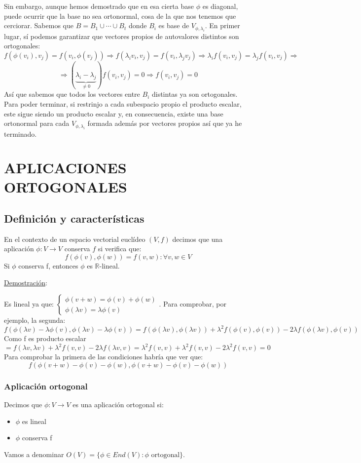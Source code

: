 \documentclass[10pt,a4paper,openright]{book}
\theoremstyle{break}
\begin{document}
Sin embargo, aunque hemos demostrado que en esa cierta base $\phi$ es diagonal, puede ocurrir que la base no sea ortonormal, cosa de la que nos tenemos que cerciorar. Sabemos que $B=B_1\cup \cdots \cup B_t$ donde $B_i$ es base de $V_{\phi, \lambda_i}$. En primer lugar, sí podemos garantizar que vectores propios de autovalores distintos son ortogonales:
$$f(\phi(v_i), v_j) = f(v_i, \phi(v_j))\Rightarrow f(\lambda_iv_i, v_j) = f(v_i, \lambda_j v_j) \Rightarrow \lambda_i f(v_i,v_j) = \lambda_j f(v_i,v_j)\Rightarrow$$
$$\Rightarrow (\underbrace{\lambda_i -\lambda_j}_{\neq 0})f(v_i,v_j) = 0\Rightarrow f(v_i, v_j) = 0$$
Así que sabemos que todos los vectores entre $B_i$ distintas ya son ortogonales. Para poder terminar, si restrinjo a cada subespacio propio el producto escalar, este sigue siendo un producto escalar y, en consecuencia, existe una base ortonormal para cada $V_{\phi, \lambda_i}$ formada además por vectores propios así que ya he terminado.

\section*{APLICACIONES ORTOGONALES}
\subsection{Definición y características}
En el contexto de un espacio vectorial euclídeo $(V,f)$ decimos que una aplicación $\phi: V\rightarrow V$ conserva $f$ si verifica que:
$$f(\phi(v),\phi(w)) = f(v,w): \forall v,w\in V$$
Si $\phi$ conserva f, entonces $\phi$ es $\mathbb{R}$-lineal.

\underline{Demostración}:

Es lineal ya que: $\begin{cases} \phi(v+w) = \phi(v)+\phi(w) \\ \phi(\lambda v) = \lambda \phi(v) \end{cases}$. Para comprobar, por ejemplo, la segunda:
$$f(\phi(\lambda v) - \lambda \phi(v),\phi(\lambda v) - \lambda \phi(v)) = f(\phi(\lambda v), \phi(\lambda v)) + \lambda^2 f(\phi(v),\phi(v)) - 2\lambda f(\phi(\lambda v), \phi(v)) $$
Como f es producto escalar
$$= f(\lambda v, \lambda v) + \lambda^2 f(v,v) -2\lambda f(\lambda v, v) = \lambda^2 f(v,v) + \lambda^2 f(v,v) - 2\lambda^2 f(v,v) = 0$$
Para comprobar la primera de las condiciones habría que ver que:
$$ f(\phi(v+w) - \phi(v) - \phi(w), \phi(v+w) - \phi(v) - \phi(w))$$

\subsubsection*{Aplicación ortogonal}
Decimos que $\phi: V\rightarrow V$ es una aplicación ortogonal si:
\begin{itemize}
\item $\phi$ es lineal
\item $\phi$ conserva f
\end{itemize}
Vamos a denominar $O(V) = \{\phi\in End(V): \phi \mbox{ ortogonal}\}$.
\end{document}
